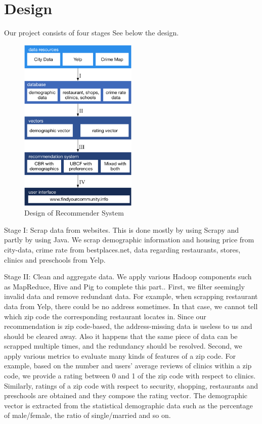 \documentclass[letterpaper,twocolumn,10pt]{article}
\begin{document}
\section{Design}
Our project consists of four stages
 See below the design.
\begin{figure}[h!]\label{fig1}
\begin{center}
\includegraphics[width=0.5\textwidth]{design.pdf}
\end{center}
\caption{ Design of Recommender System}
\end{figure}

Stage I: Scrap data from websites. This is done mostly by using Scrapy and partly by using Java.
We scrap  demographic information and  housing price from city-data, crime rate from bestplaces.net,  data regarding restaurants, stores, clinics and preschools from Yelp. 

Stage II: Clean  and aggregate data. We apply various Hadoop components such as MapReduce, Hive and Pig to complete this part.. First, we filter seemingly invalid data and remove redundant data. For example, when scrapping restaurant data from Yelp, there could be no address sometimes. In that case, we  cannot tell which zip code the corresponding restaurant locates in. Since our recommendation is zip code-based, the address-missing data is useless to us and should be cleared away. Also it happens that the same piece of data can be scrapped multiple times, and the redundancy  should be resolved. Second, we apply various metrics to evaluate many kinds of features of a zip code. For example,  based on the number  and users' average reviews of clinics within a zip code, we provide a rating between 0 and 1 of the zip code with respect to clinics. Similarly, ratings of a zip code with respect to security, shopping, 
restaurants and preschools are obtained and they compose the rating vector.  The demographic vector is extracted from the statistical demographic data such as the percentage of male/female, the ratio of single/married and so on.
\end{document}
